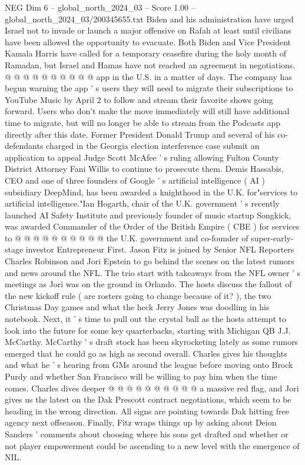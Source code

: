 \begin{textsample}{NEG Dim 6 – global\_north\_2024\_03 – Score 1.00 – global\_north\_2024\_03/200345655.txt}
Biden and his administration have urged Israel not to invade or launch a major offensive on Rafah at least until civilians have been allowed the opportunity to evacuate.
Both Biden and Vice President Kamala Harris have called for a temporary ceasefire during the holy month of Ramadan, but Israel and Hamas have not reached an agreement in negotiations. @ @ @ @ @ @ @ @ @ @ app in the U.S. in a matter of days.
The company has begun warning the app ' s users they will need to migrate their subscriptions to YouTube Music by April 2 to follow and stream their favorite shows going forward.
Users who don't make the move immediately will still have additional time to migrate, but will no longer be able to stream from the Podcasts app directly after this date.
Former President Donald Trump and several of his co-defendants charged in the Georgia election interference case submit an application to appeal Judge Scott McAfee ' s ruling allowing Fulton County District Attorney Fani Willis to continue to prosecute them.
Demis Hassabis, CEO and one of three founders of Google ' s artificial intelligence ( AI ) subsidiary DeepMind, has been awarded a knighthood in the U.K. for"services to artificial intelligence."Ian Hogarth, chair of the U.K. government ' s recently launched AI Safety Institute and previously founder of music startup Songkick, was awarded Commander of the Order of the British Empire ( CBE ) for services to @ @ @ @ @ @ @ @ @ @ the U.K. government and co-founder of super-early-stage investor Entrepreneur First.
Jason Fitz is joined by Senior NFL Reporters Charles Robinson and Jori Epstein to go behind the scenes on the latest rumors and news around the NFL.
The trio start with takeaways from the NFL owner ' s meetings as Jori was on the ground in Orlando.
The hosts discuss the fallout of the new kickoff rule ( are rosters going to change because of it? ), the two Christmas Day games and what the heck Jerry Jones was doodling in his notebook.
Next, it ' s time to pull out the crystal ball as the hosts attempt to look into the future for some key quarterbacks, starting with Michigan QB J.J.
McCarthy.
McCarthy ' s draft stock has been skyrocketing lately as some rumors emerged that he could go as high as second overall.
Charles gives his thoughts and what he ' s hearing from GMs around the league before moving onto Brock Purdy and whether San Francisco will be willing to pay him when the time comes.
Charles dives deeper @ @ @ @ @ @ @ @ @ @ a massive red flag, and Jori gives us the latest on the Dak Prescott contract negotiations, which seem to be heading in the wrong direction.
All signs are pointing towards Dak hitting free agency next offseason.
Finally, Fitz wraps things up by asking about Deion Sanders ' comments about choosing where his sons get drafted and whether or not player empowerment could be ascending to a new level with the emergence of NIL.

\end{textsample}
